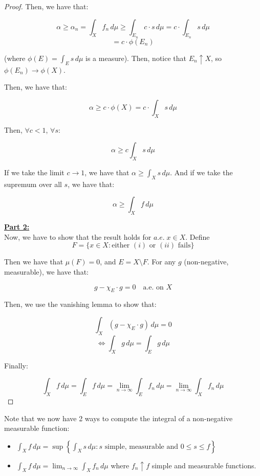 \begin{proof}
    Then, we have that:

    $$\alpha \geq \alpha_n = \int_{X} f_n \, d\mu \geq \int_{E_n} c \cdot s \, d\mu = c \cdot \int_{E_n} s \, d\mu$$
    $$= c \cdot \phi(E_n)$$

    (where $\phi(E) = \int_{E} s \, d\mu$ is a measure). Then, notice that $E_n \uparrow X$, so $\phi(E_n) \to \phi(X)$.

    Then, we have that:

    $$\alpha \geq c \cdot \phi(X) = c \cdot \int_{X} s \, d\mu$$

    Then, $\forall c < 1$, $\forall s$:

    $$\alpha \geq c \int_{X} s \, d\mu$$

    If we take the limit $c \to 1$, we have that $\alpha \geq \int_{X} s \, d\mu$. And if we take the supremum
    over all $s$, we have that:

    $$\alpha \geq \int_{X} f \, d\mu$$

    \textbf{\underline{Part 2:}}\\

    Now, we have to show that the result holds for $a.e. \; x \in X$. Define 
    $$F = \{x \in X: \text{either } (i) \text{ or } (ii) \text{ fails}\}$$

    Then we have that $\mu(F) = 0$, and $E = X \setminus F$. For any $g$ (non-negative, measurable), 
    we have that:

    $$g - \chi_E \cdot g = 0 \quad \text{a.e. on } X$$

    Then, we use the vanishing lemma to show that:

    $$\int_{X} (g - \chi_E \cdot g) \, d\mu = 0$$
    $$\iff \int_{X} g \, d\mu = \int_{E} g \, d\mu$$

    Finally:

    $$\int_X f \, d\mu = \int_{E} f \, d\mu = \lim_{n \to \infty} \int_{E} f_n \, d\mu = \lim_{n \to \infty} \int_{X} f_n \, d\mu$$

\end{proof}


\begin{fremark}
    Note that we now have 2 ways to compute the integral of a non-negative measurable function:

    \begin{itemize}
        \item $\int_{X} f \, d\mu = \sup\left\{\int_{X} s \, d\mu: s \text{ simple, measurable and } 0 \leq s \leq f\right\}$
        \vspace{1em}
        \item $\int_{X} f \, d\mu = \lim_{n \to \infty} \int_{X} f_n \, d\mu$ where $f_n \uparrow f$ simple and measurable functions.
        
    \end{itemize}
\end{fremark}

